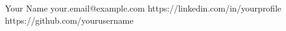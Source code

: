 \cvheader
    {Your Name}
    {your.email@example.com}
    {https://linkedin.com/in/yourprofile}
    {https://github.com/yourusername}
